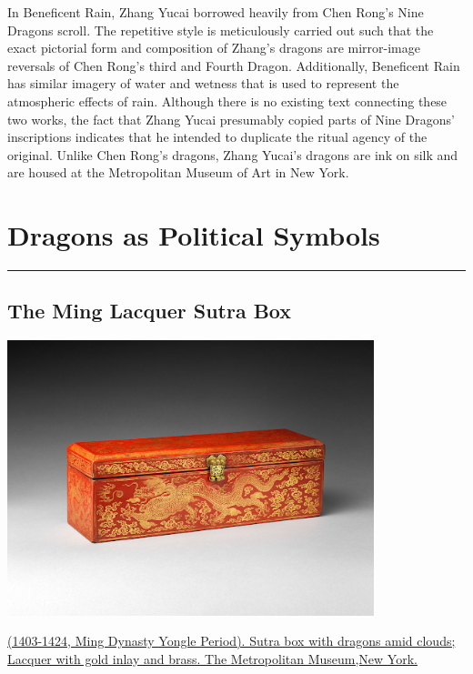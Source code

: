 \documentclass[
]{book}
\begin{document}
In Beneficent Rain, Zhang Yucai borrowed heavily from Chen Rong's Nine Dragons scroll. The repetitive style is meticulously carried out such that the exact pictorial form and composition of Zhang's dragons are mirror-image reversals of Chen Rong's third and Fourth Dragon. Additionally, Beneficent Rain has similar imagery of water and wetness that is used to represent the atmospheric effects of rain. Although there is no existing text connecting these two works, the fact that Zhang Yucai presumably copied parts of Nine Dragons' inscriptions indicates that he intended to duplicate the ritual agency of the original. Unlike Chen Rong's dragons, Zhang Yucai's dragons are ink on silk and are housed at the Metropolitan Museum of Art in New York.

\hypertarget{ming}{%
\chapter*{Dragons as Political Symbols}\label{ming}}

\begin{center}\rule{0.5\linewidth}{0.5pt}\end{center}

\hypertarget{the-ming-lacquer-sutra-box}{%
\section*{The Ming Lacquer Sutra Box}\label{the-ming-lacquer-sutra-box}}

\includegraphics[width=0.8\textwidth,height=\textheight]{images/Ming_Lacquer_Sutra_Box.png}

\href{https://www.metmuseum.org/art/collection/search/60870}{(1403-1424, Ming Dynasty Yongle Period). Sutra box with dragons amid clouds; Lacquer with gold inlay and brass. The Metropolitan Museum,New York.}
\end{document}
